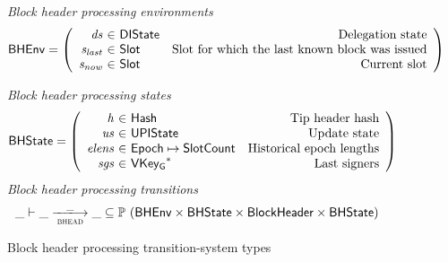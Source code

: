 \documentclass[11pt,a4paper]{article}
\newcommand{\powerset}[1]{\mathbb{P}~#1}
\newcommand{\var}[1]{\mathit{#1}}
\newcommand{\type}[1]{\mathsf{#1}}
\newcommand{\trans}[2]{\xlongrightarrow[\textsc{#1}]{#2}}
\newcommand{\seqof}[1]{#1^{*}}
\newcommand{\partialf}{\mapsto}
\newcommand{\Hash}{\type{Hash}}  %
\newcommand{\Slot}{\type{Slot}}
\newcommand{\SlotCount}{\type{SlotCount}}
\newcommand{\VKeyGen}{\type{VKey_G}}
\newcommand{\DelegState}{\type{DIState}}
\begin{document}
\begin{figure}[ht]
  \emph{Block header processing environments}
  \begin{equation*}
    \BHEnv =
    \left(
      \begin{array}{r@{~\in~}lr}
        \var{ds} & \DelegState & \text{Delegation state} \\
        \var{s_{last}} & \Slot & \text{Slot for which the last known block was issued} \\
        \var{s_{now}} & \Slot & \text{Current slot} \\
      \end{array}
    \right)
  \end{equation*}

  \emph{Block header processing states}
  \begin{equation*}
    \BHState =
    \left(
      \begin{array}{r@{~\in~}lr}
        \var{h} & \Hash & \text{Tip header hash} \\
        \var{us} & \UPIState & \text{Update state} \\
        \var{elens} & \Epoch \partialf \SlotCount & \text{Historical epoch lengths} \\
        \var{sgs} & \seqof{\VKeyGen} & \text{Last signers}
      \end{array}
    \right)
  \end{equation*}
  \emph{Block header processing transitions}
  \begin{equation*}
    \_ \vdash \var{\_} \trans{bhead}{\_} \var{\_} \subseteq
    \powerset (\BHEnv \times \BHState \times \Bhead \times \BHState)
  \end{equation*}
  \caption{Block header processing transition-system types}
  \label{fig:ts-types:bhead}
\end{figure}
\end{document}
